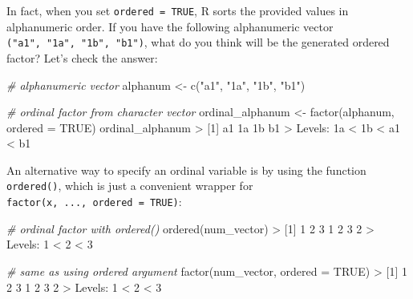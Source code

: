\documentclass[
]{book}
\newenvironment{Shaded}{\begin{snugshade}}{\end{snugshade}}
\newcommand{\AttributeTok}[1]{\textcolor[rgb]{0.77,0.63,0.00}{#1}}
\newcommand{\CommentTok}[1]{\textcolor[rgb]{0.56,0.35,0.01}{\textit{#1}}}
\newcommand{\ConstantTok}[1]{\textcolor[rgb]{0.00,0.00,0.00}{#1}}
\newcommand{\DecValTok}[1]{\textcolor[rgb]{0.00,0.00,0.81}{#1}}
\newcommand{\FunctionTok}[1]{\textcolor[rgb]{0.00,0.00,0.00}{#1}}
\newcommand{\NormalTok}[1]{#1}
\newcommand{\OtherTok}[1]{\textcolor[rgb]{0.56,0.35,0.01}{#1}}
\newcommand{\SpecialCharTok}[1]{\textcolor[rgb]{0.00,0.00,0.00}{#1}}
\newcommand{\StringTok}[1]{\textcolor[rgb]{0.31,0.60,0.02}{#1}}
\begin{document}
In fact, when you set \texttt{ordered\ =\ TRUE}, R sorts the provided values in
alphanumeric order. If you have the following alphanumeric vector
\texttt{("a1",\ "1a",\ "1b",\ "b1")}, what do you think will be the generated ordered
factor? Let's check the answer:

\begin{Shaded}
\begin{Highlighting}[]
\CommentTok{\# alphanumeric vector}
\NormalTok{alphanum }\OtherTok{\textless{}{-}} \FunctionTok{c}\NormalTok{(}\StringTok{"a1"}\NormalTok{, }\StringTok{"1a"}\NormalTok{, }\StringTok{"1b"}\NormalTok{, }\StringTok{"b1"}\NormalTok{)}

\CommentTok{\# ordinal factor from character vector}
\NormalTok{ordinal\_alphanum }\OtherTok{\textless{}{-}} \FunctionTok{factor}\NormalTok{(alphanum, }\AttributeTok{ordered =} \ConstantTok{TRUE}\NormalTok{)}
\NormalTok{ordinal\_alphanum}
\SpecialCharTok{\textgreater{}}\NormalTok{ [}\DecValTok{1}\NormalTok{] a1 1a 1b b1}
\SpecialCharTok{\textgreater{}}\NormalTok{ Levels}\SpecialCharTok{:}\NormalTok{ 1a }\SpecialCharTok{\textless{}}\NormalTok{ 1b }\SpecialCharTok{\textless{}}\NormalTok{ a1 }\SpecialCharTok{\textless{}}\NormalTok{ b1}
\end{Highlighting}
\end{Shaded}

An alternative way to specify an ordinal variable is by using the function
\texttt{ordered()}, which is just a convenient wrapper for
\texttt{factor(x,\ ...,\ ordered\ =\ TRUE)}:

\begin{Shaded}
\begin{Highlighting}[]
\CommentTok{\# ordinal factor with ordered()}
\FunctionTok{ordered}\NormalTok{(num\_vector)}
\SpecialCharTok{\textgreater{}}\NormalTok{ [}\DecValTok{1}\NormalTok{] }\DecValTok{1} \DecValTok{2} \DecValTok{3} \DecValTok{1} \DecValTok{2} \DecValTok{3} \DecValTok{2}
\SpecialCharTok{\textgreater{}}\NormalTok{ Levels}\SpecialCharTok{:} \DecValTok{1} \SpecialCharTok{\textless{}} \DecValTok{2} \SpecialCharTok{\textless{}} \DecValTok{3}

\CommentTok{\# same as using \textquotesingle{}ordered\textquotesingle{} argument}
\FunctionTok{factor}\NormalTok{(num\_vector, }\AttributeTok{ordered =} \ConstantTok{TRUE}\NormalTok{)}
\SpecialCharTok{\textgreater{}}\NormalTok{ [}\DecValTok{1}\NormalTok{] }\DecValTok{1} \DecValTok{2} \DecValTok{3} \DecValTok{1} \DecValTok{2} \DecValTok{3} \DecValTok{2}
\SpecialCharTok{\textgreater{}}\NormalTok{ Levels}\SpecialCharTok{:} \DecValTok{1} \SpecialCharTok{\textless{}} \DecValTok{2} \SpecialCharTok{\textless{}} \DecValTok{3}
\end{Highlighting}
\end{Shaded}
\end{document}
